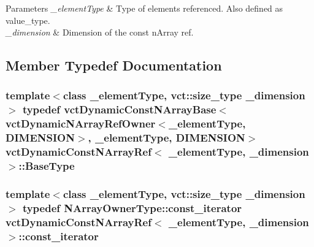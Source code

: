 \begin{DoxyParams}{Parameters}
{\em \+\_\+element\+Type} & Type of elements referenced. Also defined as {\ttfamily value\+\_\+type}.\\
\hline
{\em \+\_\+dimension} & Dimension of the const n\+Array ref. \\
\hline
\end{DoxyParams}


\subsection{Member Typedef Documentation}
\hypertarget{classvct_dynamic_const_n_array_ref_a8f6858abb088ed618d4cb4cea8309199}{}
\subsubsection[{Base\+Type}]{\setlength{\rightskip}{0pt plus 5cm}template$<$class \+\_\+element\+Type, vct\+::size\+\_\+type \+\_\+dimension$>$ typedef {\bf vct\+Dynamic\+Const\+N\+Array\+Base}$<${\bf vct\+Dynamic\+N\+Array\+Ref\+Owner}$<$\+\_\+element\+Type, {\bf D\+I\+M\+E\+N\+S\+I\+O\+N}$>$, \+\_\+element\+Type, {\bf D\+I\+M\+E\+N\+S\+I\+O\+N}$>$ {\bf vct\+Dynamic\+Const\+N\+Array\+Ref}$<$ \+\_\+element\+Type, \+\_\+dimension $>$\+::{\bf Base\+Type}}\label{classvct_dynamic_const_n_array_ref_a8f6858abb088ed618d4cb4cea8309199}
\hypertarget{classvct_dynamic_const_n_array_ref_a9787d4311b3672d3f5ef00f485441a39}{}
\subsubsection[{const\+\_\+iterator}]{\setlength{\rightskip}{0pt plus 5cm}template$<$class \+\_\+element\+Type, vct\+::size\+\_\+type \+\_\+dimension$>$ typedef {\bf N\+Array\+Owner\+Type\+::const\+\_\+iterator} {\bf vct\+Dynamic\+Const\+N\+Array\+Ref}$<$ \+\_\+element\+Type, \+\_\+dimension $>$\+::{\bf const\+\_\+iterator}}\label{classvct_dynamic_const_n_array_ref_a9787d4311b3672d3f5ef00f485441a39}
\hypertarget{classvct_dynamic_const_n_array_ref_ac774d4a8e4c0f0a5caeab26c96531d96}{}
